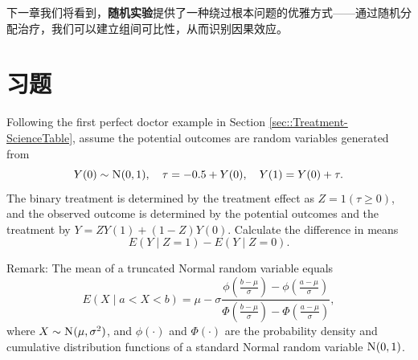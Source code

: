 下一章我们将看到，\textbf{随机实验}提供了一种绕过根本问题的优雅方式——通过随机分配治疗，我们可以建立组间可比性，从而识别因果效应。

\section{习题}\label{sec:2-homework}

\begin{HomeworkProblem}\label{exr:2-1}

Following the first perfect doctor example in Section \ref{sec::Treatment-ScienceTable}, assume the potential outcomes are random variables generated from
\[
Y(0) \sim \textsc{N}(0,1), \quad \tau = -0.5 + Y(0),\quad Y(1)  = Y(0) + \tau .
\]
The binary treatment is determined by the treatment effect as $Z = 1(\tau \geq 0)$, and the observed outcome is determined by the potential outcomes and the treatment by $Y = ZY(1) + (1-Z) Y(0)$. Calculate the difference in means
\[
E(Y\mid Z=1) - E(Y\mid Z=0).
\]


Remark: The mean of a truncated Normal random variable equals
\[
E(X\mid   a < X < b ) = \mu - \sigma \frac{   \phi \left(  \frac{b-\mu}{\sigma} \right )   -  \phi \left(  \frac{a-\mu}{\sigma} \right )   }
{   \Phi \left(  \frac{b-\mu}{\sigma} \right )   -  \Phi \left(  \frac{a-\mu}{\sigma} \right )   } ,
\]
where $X \sim \textsc{N}(\mu, \sigma^2)$, and $\phi(\cdot)$ and $\Phi(\cdot)$ are the probability density and cumulative distribution functions of a standard Normal random variable $\textsc{N}(0,1)$.



\end{HomeworkProblem}

